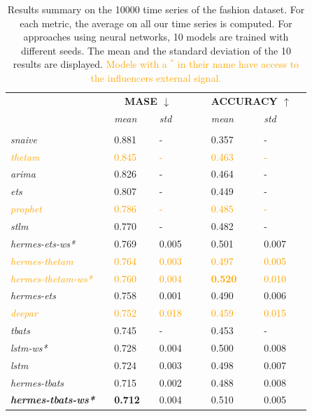 \documentclass[10pt]{article} %
\begin{document}
\begin{table}
  \caption{Results summary on the 10000 time series of the fashion dataset. For each metric, the average on all our time series is computed. For approaches using neural networks, 10 models are trained with different seeds. The mean and the standard deviation of the 10 results are displayed. \textcolor{orange}{Models with a $^*$ in their name have access to the influencers external signal.}}
  \centering
  \begin{tabular}{l||lllll|lllll}
   &&\multicolumn{3}{c}{\textbf{MASE $\downarrow$}} &&& \multicolumn{3}{c}{\textbf{ACCURACY $\uparrow$}}&\\
    &&  \textit{mean}  && \textit{std} &&&  \textit{mean}  && \textit{std}& \\
	 \hline
	 &&&&&&&&&&\\
     \textit{snaive} && 0.881 && - &&& 0.357 && - &\\
     \textcolor{orange}{\textit{thetam}} && \textcolor{orange}{0.845} && \textcolor{orange}{-} &&& \textcolor{orange}{0.463} && \textcolor{orange}{-}\\
     \textit{arima} && 0.826 && -&&& 0.464 && - & \\
     \textit{ets} && 0.807 && -&&& 0.449 && - & \\
     \textcolor{orange}{\textit{prophet}} && \textcolor{orange}{0.786} && \textcolor{orange}{-} &&& \textcolor{orange}{0.485} && \textcolor{orange}{-}\\
     \textit{stlm} && 0.770 && -&&& 0.482 && - & \\
     \textit{hermes-ets-ws*} && 0.769 && 0.005 &&& 0.501 && 0.007 &\\
     \textcolor{orange}{\textit{hermes-thetam}} && \textcolor{orange}{0.764} && \textcolor{orange}{0.003} &&& \textcolor{orange}{0.497} && \textcolor{orange}{0.005}\\
     \textcolor{orange}{\textit{hermes-thetam-ws*}} && \textcolor{orange}{0.760} && \textcolor{orange}{0.004} &&& \textcolor{orange}{\textbf{0.520}} && \textcolor{orange}{0.010}\\
     \textit{hermes-ets} && 0.758 && 0.001 &&& 0.490 && 0.006 &\\
     \textcolor{orange}{\textit{deepar}} && \textcolor{orange}{0.752} && \textcolor{orange}{0.018} &&& \textcolor{orange}{0.459} && \textcolor{orange}{0.015}\\
     \textit{tbats} && 0.745 && -&&& 0.453 && - & \\
     \textit{lstm-ws*} && 0.728 && 0.004 &&& 0.500 && 0.008 &\\
     \textit{lstm} && 0.724 && 0.003 &&& 0.498 && 0.007 &\\
     \textit{hermes-tbats} && 0.715 && 0.002 &&& 0.488 && 0.008 &\\
     \textbf{\textit{hermes-tbats-ws*}} && \textbf{0.712} && 0.004 &&& 0.510 && 0.005 &\\
  \end{tabular}
\label{tab:metricresults}
\end{table}
\end{document}
